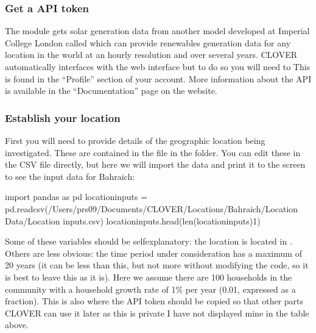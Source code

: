 \documentclass[letterpaper,10pt,english]{sphinxmanual}
\begin{document}
\subsubsection{Get a  API token}
\label{\detokenize{general_setup:get-a-renewables-ninja-api-token}}
\sphinxAtStartPar
The  module gets solar generation data from another model
developed at Imperial College London called  which can
provide renewables generation data for any location in the world at an
hourly resolution and over several years. CLOVER automatically
interfaces with the  web interface but to do so you
will need to  This is found in the
“Profile” section of your  account. More information
about the API is available in the “Documentation” page on the website.


\subsubsection{Establish your location}
\label{\detokenize{general_setup:establish-your-location}}
\sphinxAtStartPar
First you will need to provide details of the geographic location being
investigated. These are contained in the  file in the
 folder. You can edit these in the CSV file directly, but
here we will import the data and print it to the screen to see the input
data for Bahraich:

\begin{sphinxVerbatim}[commandchars=\\\{\}]
import pandas as pd
location\PYGZus{}inputs = pd.read\PYGZus{}csv(\PYGZdq{}/Users/prs09/Documents/CLOVER/Locations/Bahraich/Location Data/Location inputs.csv\PYGZdq{})
location\PYGZus{}inputs.head(len(location\PYGZus{}inputs)\PYGZhy{}1)
\end{sphinxVerbatim}



\begin{DUlineblock}{0em}
\item[] 
\end{DUlineblock}

\sphinxAtStartPar
Some of these variables should be self\sphinxhyphen{}explanatory: the location
 is located in . Others are less obvious: the time
period under consideration has a maximum of 20 years (it can be less
than this, but not more without modifying the code, so it is best to
leave this as it is). Here we assume there are 100 households in the
community with a household growth rate of 1\% per year (0.01, expressed
as a fraction). This is also where the  API token
should be copied so that other parts CLOVER can use it later \sphinxhyphen{} as this
is private I have not displayed mine in the table above.
\end{document}
